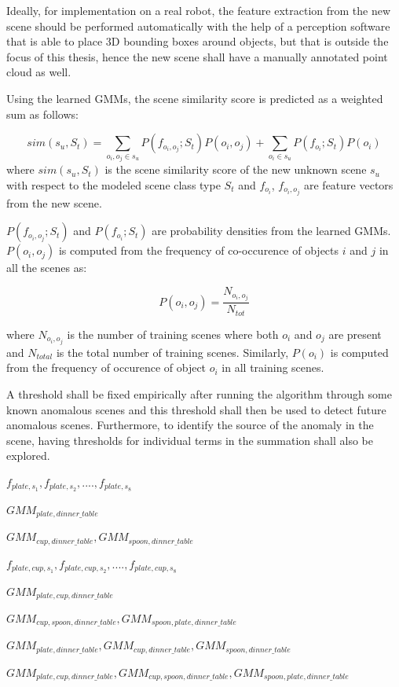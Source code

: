 \documentclass[12pt]{article}
\begin{document}
Ideally, for implementation on a real robot, the feature extraction from the new scene should be performed automatically with the help of a perception software that is able to place 3D bounding boxes around objects, but that is outside the focus of this thesis, hence the new scene shall have a manually annotated point cloud as well.

Using the learned GMMs, the scene similarity score is predicted as a weighted sum as follows:

\[sim(s_u, S_t) = \sum_{o_i, o_j \in s_u} P(f_{o_i, o_j};S_t)P(o_i, o_j) + 
\sum_{o_i \in s_u} P(f_{o_i};S_t)P(o_i)\]
where $sim(s_u, S_t)$ is the scene similarity score of the new unknown scene $s_u$ with respect to the modeled scene class type $S_t$ and $f_{o_i}$, $f_{o_i, o_j}$ are feature vectors from the new scene. 

$P(f_{o_i, o_j};S_t)$ and $P(f_{o_i};S_t)$ are probability densities from the learned GMMs. $P(o_i, o_j)$ is computed from the frequency of co-occurence of objects $i$ and $j$ in all the scenes as:

\[P(o_i, o_j) = \frac{N_{o_i, o_j}}{N_{tot}}\]

where $N_{o_i, o_j}$ is the number of training scenes where both $o_i$ and $o_j$ are present and $N_{total}$ is the total number of training scenes. Similarly, $P(o_i)$ is computed from the frequency of occurence of object $o_i$ in all training scenes.

A threshold shall be fixed empirically after running the algorithm through some known anomalous scenes and this threshold shall then be used to detect future anomalous scenes. Furthermore, to identify the source of the anomaly in the scene, having thresholds for individual terms in the summation shall also be explored.

$f_{plate, s_{1}}, f_{plate, s_{2}},....,f_{plate, s_{8}}$

$GMM_{plate, dinner\_table}$

$GMM_{cup, dinner\_table}, GMM_{spoon, dinner\_table}$

$f_{plate, cup, s_{1}}, f_{plate, cup, s_{2}},....,f_{plate, cup, s_{8}}$

$GMM_{plate, cup, dinner\_table}$

$GMM_{cup, spoon, dinner\_table}, GMM_{spoon, plate, dinner\_table}$

$GMM_{plate, dinner\_table}, GMM_{cup, dinner\_table}, GMM_{spoon, dinner\_table}$

$GMM_{plate, cup, dinner\_table}, GMM_{cup, spoon, dinner\_table}, GMM_{spoon, plate, dinner\_table}$
\end{document}
